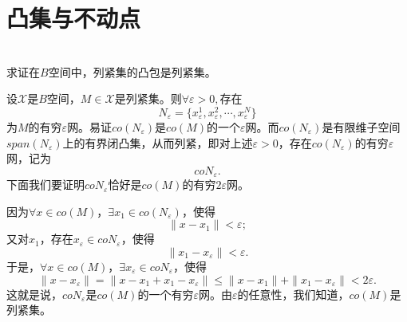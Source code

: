 \section{凸集与不动点}
\begin{exercise}
\hfill\\
求证在$B$空间中，列紧集的凸包是列紧集。

设$\mathscr{X}$是$B$空间，$M\in\mathscr{X}$是列紧集。则$\forall\varepsilon>0,$存在$$N_{\varepsilon}=\{x_{\varepsilon}^1,x_{\varepsilon}^2,\cdots,x_{\varepsilon}^N\}$$为$M$的有穷$\varepsilon$网。易证$co(N_{\varepsilon})$是$co(M)$的一个$\varepsilon$网。而$co(N_{\varepsilon})$是有限维子空间$span(N_{\varepsilon})$上的有界闭凸集，从而列紧，即对上述$\varepsilon>0$，存在$co(N_{\varepsilon})$的有穷$\varepsilon$网，记为$$coN_{\varepsilon}.$$下面我们要证明$coN_{\varepsilon}$恰好是$co(M)$的有穷$2\varepsilon$网。

因为$\forall x\in co(M)$，$\exists x_1\in co(N_{\varepsilon})$，使得$$\|x-x_1\|<\varepsilon;$$又对$x_1$，存在$x_{\varepsilon}\in coN_{\varepsilon}$，使得$$\|x_1-x_{\varepsilon}\|<\varepsilon.$$
于是，$\forall x\in co(M)$，$\exists x_{\varepsilon}\in coN_{\varepsilon}$，使得
$$\|x-x_{\varepsilon}\|=\|x-x_1+x_1-x_{\varepsilon}\|\leq\|x-x_1\|+\|x_1-x_{\varepsilon}\|<2\varepsilon.$$
这就是说，$coN_\varepsilon$是$co(M)$的一个有穷$\varepsilon$网。由$\varepsilon$的任意性，我们知道，$co(M)$是列紧集。
\end{exercise}

